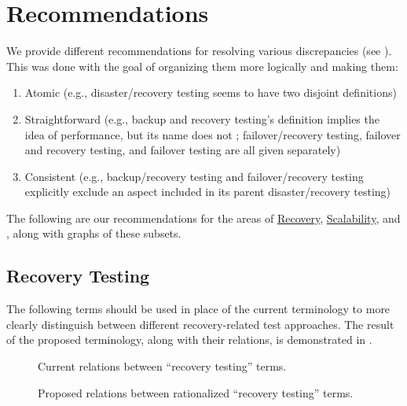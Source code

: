 \section{Recommendations}
\label{recs}

We provide different recommendations for resolving various
discrepancies (see ). This was done with the goal of
organizing them more logically and making them:
\begin{enumerate}
    \item Atomic (e.g., disaster/recovery testing seems to have two
          disjoint definitions)
    \item Straightforward (e.g., backup and recovery testing's definition
          implies the idea of performance, but its name does not
          \ifnotpaper; failover/recovery testing, failover and recovery
          testing, and failover testing are all given separately\fi)
    \item Consistent (e.g., backup/recovery testing and failover/recovery
          testing explicitly exclude an aspect included in its parent
          disaster/recovery testing)
\end{enumerate}
The following are our recommendations for the areas of
\hyperref[rec-test-rec]{Recovery}, \hyperref[scal-test-rec]{Scalability}, and
, along with graphs of these subsets.

\subsection{Recovery Testing}
\label{rec-test-rec}
The following terms should be used in place of the current terminology to
more clearly distinguish between different recovery-related test approaches.
The result of the proposed terminology, along with their relations, is
demonstrated in .

\begin{figure}[bt!]
    \centering
    \begin{minipage}{.575\linewidth}
        \centering
        \recoveryGraphCurrent{}
        \caption{Current relations between ``recovery
            testing'' terms.}
        \label{fig:recovery-graph-current}
    \end{minipage}%
    \begin{minipage}{.425\linewidth}
        \centering
        \recoveryGraphProposed{}
        \caption{Proposed relations between
            rationalized ``recovery testing'' terms.}
        \label{fig:recovery-graph-proposed}
    \end{minipage}
\end{figure}

